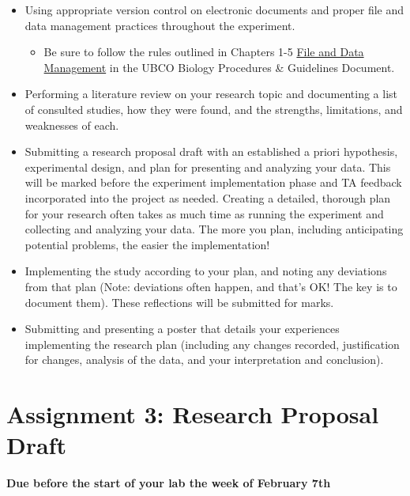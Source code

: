 \documentclass[
]{book}
\providecommand{\tightlist}{%
  \setlength{\itemsep}{0pt}\setlength{\parskip}{0pt}}
\begin{document}
\begin{itemize}
\tightlist
\item
  Using appropriate version control on electronic documents and proper file and data management practices throughout the experiment.

  \begin{itemize}
  \tightlist
  \item
    Be sure to follow the rules outlined in Chapters 1-5 \href{https://ubco-biology.github.io/Procedures-and-Guidelines/file-and-data-management.html}{File and Data Management} in the UBCO Biology Procedures \& Guidelines Document.
  \end{itemize}
\item
  Performing a literature review on your research topic and documenting a list of consulted studies, how they were found, and the strengths, limitations, and weaknesses of each.
\item
  Submitting a research proposal draft with an established a priori hypothesis, experimental design, and plan for presenting and analyzing your data. This will be marked before the experiment implementation phase and TA feedback incorporated into the project as needed. Creating a detailed, thorough plan for your research often takes as much time as running the experiment and collecting and analyzing your data. The more you plan, including anticipating potential problems, the easier the implementation!
\item
  Implementing the study according to your plan, and noting any deviations from that plan (Note: deviations often happen, and that's OK! The key is to document them). These reflections will be submitted for marks.
\item
  Submitting and presenting a poster that details your experiences implementing the research plan (including any changes recorded, justification for changes, analysis of the data, and your interpretation and conclusion).
\end{itemize}

\hypertarget{assignment-3-research-proposal-draft}{%
\chapter*{Assignment 3: Research Proposal Draft}\label{assignment-3-research-proposal-draft}}

\textbf{Due before the start of your lab the week of February 7th}
\end{document}
